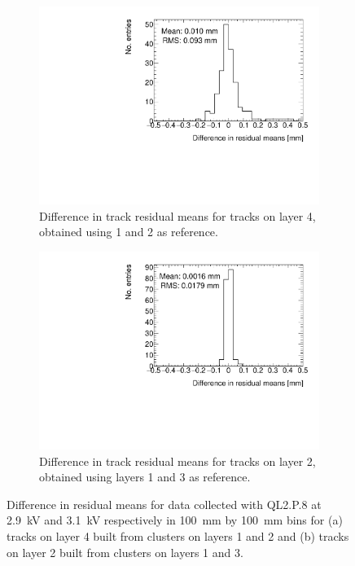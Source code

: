 \begin{figure}
\centering
\begin{subfigure}{.5\textwidth}
  \centering
  \includegraphics[width=\linewidth]{figures/figure_compare_residual_fits_QL2P08_2900V_2021-05-21_minus_QL2P08_3100V_2021-05-21_layer4_fixedlayers12_mean_differences.pdf}
  \caption{Difference in track residual means for tracks on layer 4, obtained using 1 and 2 as reference.}
  \label{fig:voltage_compare_fits_412}
\end{subfigure}%
\begin{subfigure}{.5\textwidth}
  \centering
  \includegraphics[width=\linewidth]{figures/figure_compare_residual_fits_QL2P08_2900V_2021-05-21_minus_QL2P08_3100V_2021-05-21_layer2_fixedlayers13_mean_differences.pdf}
  \caption{Difference in track residual means for tracks on layer 2, obtained using layers 1 and 3 as reference.}
  \label{fig:voltage_compare_fits_213}
\end{subfigure}
\caption{Difference in residual means for data collected with QL2.P.8 at 2.9~kV and 3.1~kV respectively in \SI{100}{\milli\meter} by \SI{100}{\milli\meter} bins for (a) tracks on layer 4 built from clusters on layers 1 and 2 and (b) tracks on layer 2 built from clusters on layers 1 and 3.}
\label{fig:voltage_compare_fits}
\end{figure}

